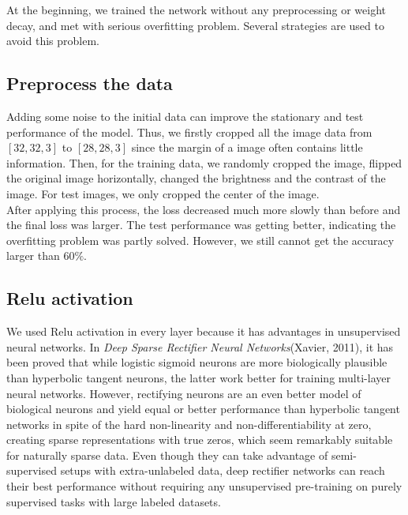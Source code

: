 \documentclass[hyperref]{article}
\theoremstyle{nonumberplain}
\begin{document}
At the beginning, we trained the network without any preprocessing or weight decay, and met with serious overfitting problem. Several strategies are used to avoid this problem.
\subsection{Preprocess the data}
Adding some noise to the initial data can improve the stationary and test performance of the model. Thus, we firstly cropped all the image data from $[32,32,3]$ to $[28,28,3]$ since the margin of a image often contains little information. Then, for the training data, we randomly cropped the image, flipped the original image horizontally, changed the brightness and the contrast of the image. For test images, we only cropped the center of the image. \\
After applying this process, the loss decreased much more slowly than before and the final loss was larger. The test performance was getting better, indicating the overfitting problem was partly solved. However, we still cannot get the accuracy larger than $60\%$.

\subsection{Relu activation}
We used Relu activation in every layer because it has advantages in unsupervised neural networks. In {\em Deep Sparse Rectifier Neural Networks}(Xavier, 2011), it has been proved that while logistic sigmoid neurons are more biologically plausible than hyperbolic tangent neurons, the latter work better for training multi-layer neural networks. However, rectifying neurons are an even better model of biological neurons and yield equal or better performance than hyperbolic tangent networks in spite of the hard non-linearity and non-differentiability at zero, creating sparse representations with true zeros, which seem remarkably suitable for naturally sparse data. Even though they can take advantage of semi-supervised setups with extra-unlabeled data, deep rectifier networks can reach their best performance without requiring any unsupervised pre-training on purely supervised tasks with large labeled datasets.\cite{Xaiver}
\end{document}
